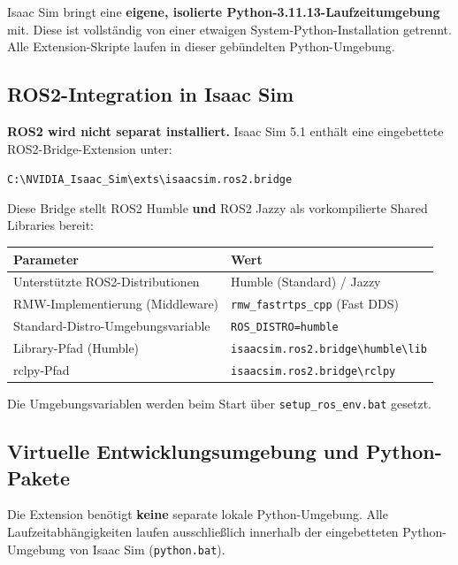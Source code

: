 \documentclass[11pt,a4paper]{article}
\begin{document}
\begin{notebox}
Isaac Sim bringt eine \textbf{eigene, isolierte Python-3.11.13-Laufzeitumgebung}
mit. Diese ist vollständig von einer etwaigen System-Python-Installation
getrennt. Alle Extension-Skripte laufen in dieser gebündelten
Python-Umgebung.
\end{notebox}

\subsection{ROS2-Integration in Isaac Sim}

\textbf{ROS2 wird nicht separat installiert.} Isaac Sim 5.1 enthält eine
eingebettete ROS2-Bridge-Extension unter:
\begin{center}
  \texttt{C:\textbackslash{}NVIDIA\_Isaac\_Sim\textbackslash{}exts\textbackslash{}isaacsim.ros2.bridge}
\end{center}

Diese Bridge stellt ROS2 Humble \textbf{und} ROS2 Jazzy als
vorkompilierte Shared Libraries bereit:

\begin{center}
\begin{tabular}{ll}
  \toprule
  Parameter & Wert \\
  \midrule
  Unterstützte ROS2-Distributionen & Humble (Standard) / Jazzy \\
  RMW-Implementierung (Middleware) & \texttt{rmw\_fastrtps\_cpp} (Fast DDS) \\
  Standard-Distro-Umgebungsvariable & \texttt{ROS\_DISTRO=humble} \\
  Library-Pfad (Humble) & \texttt{isaacsim.ros2.bridge\textbackslash{}humble\textbackslash{}lib} \\
  rclpy-Pfad & \texttt{isaacsim.ros2.bridge\textbackslash{}rclpy} \\
  \bottomrule
\end{tabular}
\end{center}

Die Umgebungsvariablen werden beim Start über
\texttt{setup\_ros\_env.bat} gesetzt.

\subsection{Virtuelle Entwicklungsumgebung und Python-Pakete}

Die Extension benötigt \textbf{keine} separate lokale Python-Umgebung.
Alle Laufzeitabhängigkeiten laufen ausschließlich innerhalb der
eingebetteten Python-Umgebung von Isaac Sim (\texttt{python.bat}).
\end{document}
